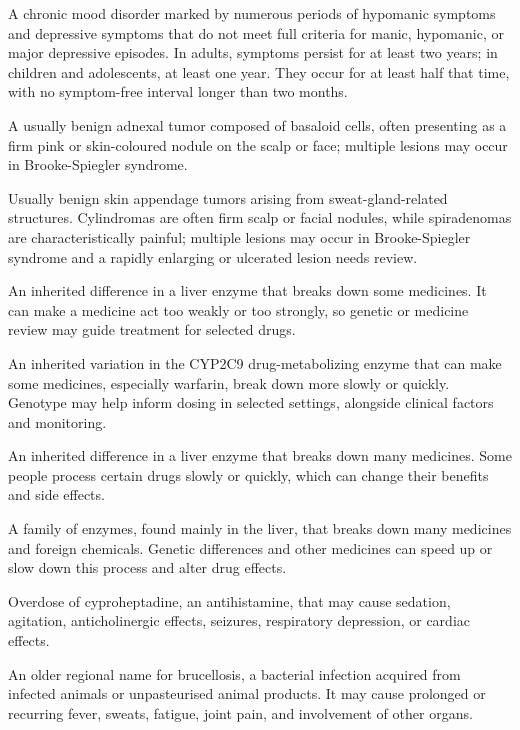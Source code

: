  A chronic mood disorder marked by numerous periods of hypomanic symptoms and depressive symptoms that do not meet full criteria for manic, hypomanic, or major depressive episodes. In adults, symptoms persist for at least two years; in children and adolescents, at least one year. They occur for at least half that time, with no symptom-free interval longer than two months.

 A usually benign adnexal tumor composed of basaloid cells, often presenting as a firm pink or skin-coloured nodule on the scalp or face; multiple lesions may occur in Brooke-Spiegler syndrome.

 Usually benign skin appendage tumors arising from sweat-gland-related structures. Cylindromas are often firm scalp or facial nodules, while spiradenomas are characteristically painful; multiple lesions may occur in Brooke-Spiegler syndrome and a rapidly enlarging or ulcerated lesion needs review.

 An inherited difference in a liver enzyme that breaks down some medicines. It can make a medicine act too weakly or too strongly, so genetic or medicine review may guide treatment for selected drugs.

 An inherited variation in the CYP2C9 drug-metabolizing enzyme that can make some medicines, especially warfarin, break down more slowly or quickly. Genotype may help inform dosing in selected settings, alongside clinical factors and monitoring.

 An inherited difference in a liver enzyme that breaks down many medicines. Some people process certain drugs slowly or quickly, which can change their benefits and side effects.

 A family of enzymes, found mainly in the liver, that breaks down many medicines and foreign chemicals. Genetic differences and other medicines can speed up or slow down this process and alter drug effects.

 Overdose of cyproheptadine, an antihistamine, that may cause sedation, agitation, anticholinergic effects, seizures, respiratory depression, or cardiac effects.

 An older regional name for brucellosis, a bacterial infection acquired from infected animals or unpasteurised animal products. It may cause prolonged or recurring fever, sweats, fatigue, joint pain, and involvement of other organs.

